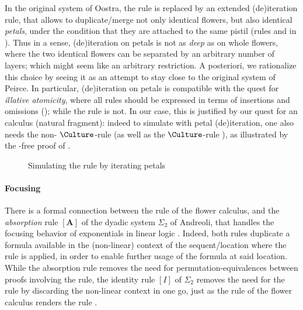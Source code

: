 In the original  system of Oostra, the  rule is replaced by an
extended (de)iteration rule, that allows to duplicate/merge not only identical
flowers, but also identical \emph{petals}, under the condition that they are
attached to the same pistil (rules 
and  in ). Thus in a sense, (de)iteration
on petals is not as \emph{deep} as on whole flowers, where the two identical
flowers can be separated by an arbitrary number of layers; which might seem like
an arbitrary restriction. A posteriori, we rationalize this choice by seeing it
as an attempt to stay close to the original system  of Peirce. In
particular, (de)iteration on petals is compatible with the quest for
\emph{illative atomicity}, where all rules should be expressed in terms of
insertions and omissions (); while the  rule is not.
In our case, this is justified by our quest for an \emph{} calculus
(natural fragment): indeed to simulate  with petal (de)iteration, one
also needs the non- $\Culture$-rule  (as well as the
$\Culture$-rule ), as illustrated by the -free proof of
.

\begin{figure}
  
  \caption{Simulating the  rule by iterating petals}
\end{figure}

\paragraph{Focusing}

There is a formal connection between the  rule of the flower
calculus, and the \emph{absorption} rule $[\mathbf{A}]$ of the dyadic system
$\Sigma_2$ of Andreoli, that handles the focusing behavior of exponentials in
linear logic . Indeed, both rules duplicate a formula
available in the (non-linear) context of the sequent/location where the rule is
applied, in order to enable further usage of the formula at said location. While
the absorption rule removes the need for permutation-equivalences between proofs
involving the \emph{} rule, the identity rule $[I]$ of $\Sigma_2$
removes the need for the \emph{} rule by discarding the non-linear
context in one go, just as the  rule of the flower calculus renders
the  rule .

